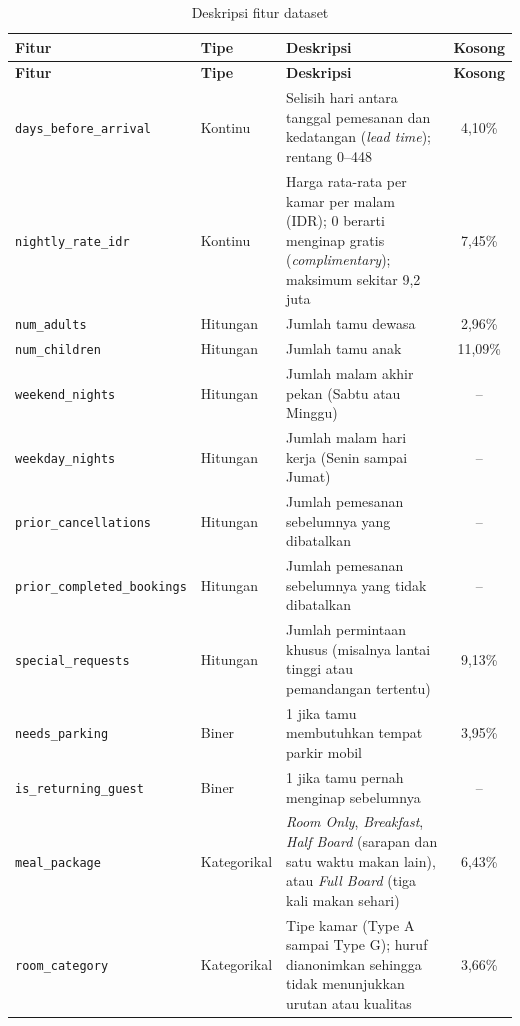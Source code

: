 \begin{longtable}{p{3.8cm} p{2.1cm} p{5.6cm} c}
	\caption{Deskripsi fitur dataset}\label{tab:fitur}\\
	\toprule
	\textbf{Fitur} & \textbf{Tipe} & \textbf{Deskripsi} & \textbf{Kosong} \\
	\midrule
	\endfirsthead
	\toprule
	\textbf{Fitur} & \textbf{Tipe} & \textbf{Deskripsi} & \textbf{Kosong} \\
	\midrule
	\endhead
	\texttt{days\_\allowbreak before\_\allowbreak arrival} & Kontinu & Selisih hari antara tanggal pemesanan dan kedatangan (\textit{lead time}); rentang 0--448 & 4,10\% \\
	\texttt{nightly\_\allowbreak rate\_\allowbreak idr} & Kontinu & Harga rata-rata per kamar per malam (IDR); 0 berarti menginap gratis (\textit{complimentary}); maksimum sekitar 9,2 juta & 7,45\% \\
	\midrule
	\texttt{num\_adults} & Hitungan & Jumlah tamu dewasa & 2,96\% \\
	\texttt{num\_children} & Hitungan & Jumlah tamu anak & 11,09\% \\
	\texttt{weekend\_\allowbreak nights} & Hitungan & Jumlah malam akhir pekan (Sabtu atau Minggu) & -- \\
	\texttt{weekday\_\allowbreak nights} & Hitungan & Jumlah malam hari kerja (Senin sampai Jumat) & -- \\
	\texttt{prior\_\allowbreak cancellations} & Hitungan & Jumlah pemesanan sebelumnya yang dibatalkan & -- \\
	\texttt{prior\_\allowbreak completed\_\allowbreak bookings} & Hitungan & Jumlah pemesanan sebelumnya yang tidak dibatalkan & -- \\
	\texttt{special\_\allowbreak requests} & Hitungan & Jumlah permintaan khusus (misalnya lantai tinggi atau pemandangan tertentu) & 9,13\% \\
	\midrule
	\texttt{needs\_\allowbreak parking} & Biner & 1 jika tamu membutuhkan tempat parkir mobil & 3,95\% \\
	\texttt{is\_\allowbreak returning\_\allowbreak guest} & Biner & 1 jika tamu pernah menginap sebelumnya & -- \\
	\midrule
	\texttt{meal\_package} & Kategorikal & \textit{Room Only}, \textit{Breakfast}, \textit{Half Board} (sarapan dan satu waktu makan lain), atau \textit{Full Board} (tiga kali makan sehari) & 6,43\% \\
	\texttt{room\_\allowbreak category} & Kategorikal & Tipe kamar (Type A sampai Type G); huruf dianonimkan sehingga tidak menunjukkan urutan atau kualitas & 3,66\% \\

\end{longtable}
